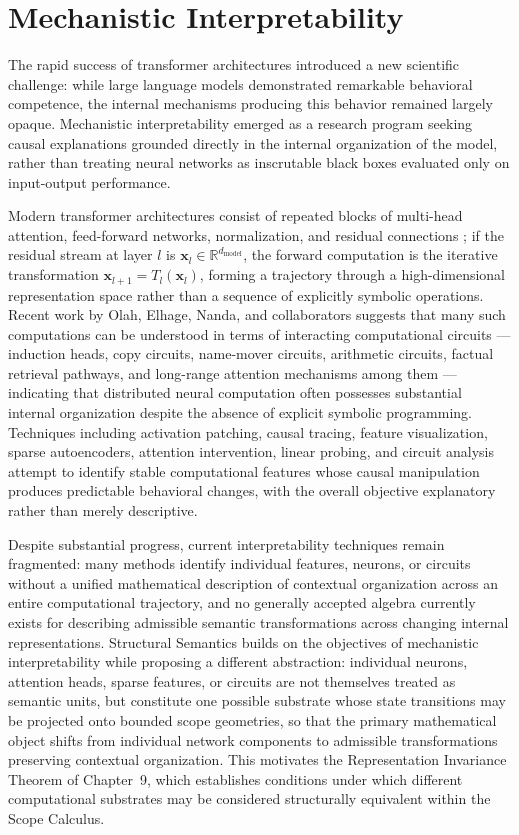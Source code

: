 \documentclass[11pt,twoside,openright]{book}
\numberwithin{equation}{chapter}
\theoremstyle{definition}
\theoremstyle{plain}
\theoremstyle{remark}
\theoremstyle{definition}
\begin{document}
\section{Mechanistic Interpretability}

The rapid success of transformer architectures introduced a new
scientific challenge: while large language models demonstrated remarkable
behavioral competence, the internal mechanisms producing this behavior
remained largely opaque. Mechanistic interpretability emerged as a
research program seeking causal explanations grounded directly in the
internal organization of the model, rather than treating neural networks
as inscrutable black boxes evaluated only on input-output performance.

Modern transformer architectures consist of repeated blocks of multi-head
attention, feed-forward networks, normalization, and residual connections
\cite{Vaswani2017}; if the residual stream at layer $l$ is
$\mathbf{x}_l\in\mathbb{R}^{d_{\mathrm{model}}}$, the forward computation
is the iterative transformation $\mathbf{x}_{l+1}=T_l(\mathbf{x}_l)$,
forming a trajectory through a high-dimensional representation space
rather than a sequence of explicitly symbolic operations. Recent work by
Olah, Elhage, Nanda, and collaborators suggests that many such
computations can be understood in terms of interacting computational
circuits --- induction heads, copy circuits, name-mover circuits,
arithmetic circuits, factual retrieval pathways, and long-range attention
mechanisms among them \cite{Olah2020,Elhage2021,Nanda2023} --- indicating
that distributed neural computation often possesses substantial internal
organization despite the absence of explicit symbolic programming.
Techniques including activation patching, causal tracing, feature
visualization, sparse autoencoders, attention intervention, linear
probing, and circuit analysis \cite{Olah2020,Elhage2021,Marks2024} attempt
to identify stable computational features whose causal manipulation
produces predictable behavioral changes, with the overall objective
explanatory rather than merely descriptive.

Despite substantial progress, current interpretability techniques remain
fragmented: many methods identify individual features, neurons, or
circuits without a unified mathematical description of contextual
organization across an entire computational trajectory, and no generally
accepted algebra currently exists for describing admissible semantic
transformations across changing internal representations. Structural
Semantics builds on the objectives of mechanistic interpretability while
proposing a different abstraction: individual neurons, attention heads,
sparse features, or circuits are not themselves treated as semantic
units, but constitute one possible substrate whose state transitions may
be projected onto bounded scope geometries, so that the primary
mathematical object shifts from individual network components to
admissible transformations preserving contextual organization. This
motivates the Representation Invariance Theorem of Chapter~9, which
establishes conditions under which different computational substrates may
be considered structurally equivalent within the Scope Calculus.
\end{document}
